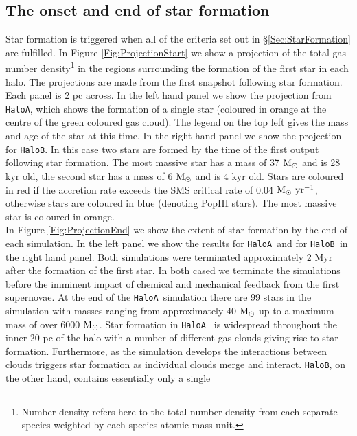 \documentclass[graphics, twocolumn, usenatbib]{mn2e}
\newcommand{\msolar} {$\rm{M_{\odot}}~$}
\newcommand{\msolarc} {$\rm{M_{\odot}}$}
\newcommand{\msolaryrc} {$\rm{M_{\odot}~yr^{-1}}$}
\newcommand{\ha} {\texttt{HaloA~}}
\newcommand{\hb} {\texttt{HaloB~}}
\newcommand{\hac} {\texttt{HaloA}}
\newcommand{\hbc} {\texttt{HaloB}}
\begin{document}



\subsection{The onset and end of star formation}
Star formation is triggered when all of the criteria set out in \S \ref{Sec:StarFormation} are
fulfilled. In Figure \ref{Fig:ProjectionStart} we show a projection of the total gas number
density\footnote{Number density refers here to the total number density from each separate
  species weighted by each species atomic mass unit.} in the
regions surrounding the formation of the first star in each halo. The projections are made from the
first snapshot following star formation. Each panel is 2 pc across. In the left hand panel we
show the projection from \hac, which shows the formation of a single star (coloured in orange
at the centre of the green coloured gas cloud). The legend on the top left gives the mass and
age of the star at this time.
In the right-hand panel we show the projection for \hbc. In this case two stars are formed by
the time of the first
output following star formation. The most massive star has a mass of 37 \msolar and is 28 kyr old,
the second star has a mass of 6 \msolar and is 4 kyr old. Stars are coloured in red if the
accretion rate exceeds the SMS critical rate of 0.04 \msolaryrc, otherwise 
stars are coloured in blue (denoting PopIII stars). The most massive star is
coloured in orange. \\
\indent In Figure \ref{Fig:ProjectionEnd} we show the extent of star formation by the end of each
simulation. In the left panel we show the results for \ha and
for \hb in the right hand panel. Both simulations were terminated approximately 2 Myr 
after the formation of the first star. In both cased we terminate the simulations
before the imminent impact of chemical and mechanical feedback from the first supernovae.
At the end of the \ha simulation there are 99 stars in the simulation with masses ranging from
approximately 40 \msolar up to a maximum mass of over 6000 \msolarc.  Star formation in \ha
is widespread throughout the inner 20 pc of the halo with a number of different gas clouds
giving rise to star formation.
Furthermore, as the simulation develops the interactions between clouds triggers star formation as
individual clouds merge and interact. \hbc, on the other hand, contains essentially only a single
\end{document}
